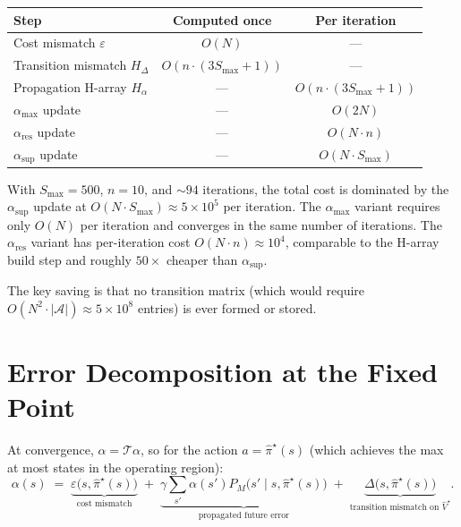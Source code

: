 \documentclass[11pt]{article}
\newcommand{\Smax}{S_{\max}}
\newcommand{\pihatstar}{\hat\pi^\star}
\newcommand{\Vhatstar}{\hat V^\star}
\newcommand{\alphares}{\alpha_{\mathrm{res}}}
\begin{document}
\begin{center}
\begin{tabular}{lcc}
\toprule
Step & Computed once & Per iteration \\
\midrule
Cost mismatch $\varepsilon$ & $O(N)$ & --- \\
Transition mismatch $H_\Delta$ & $O(n \cdot (3\Smax+1))$ & --- \\
Propagation H-array $H_\alpha$ & --- & $O(n \cdot (3\Smax+1))$ \\
$\alpha_{\max}$ update & --- & $O(2N)$ \\
$\alphares$ update & --- & $O(N \cdot n)$ \\
$\alpha_{\sup}$ update & --- & $O(N \cdot \Smax)$ \\
\bottomrule
\end{tabular}
\end{center}

With $\Smax = 500$, $n = 10$, and $\sim 94$ iterations, the total cost is
dominated by the $\alpha_{\sup}$ update at $O(N \cdot \Smax) \approx 5 \times
10^5$ per iteration.  The $\alpha_{\max}$ variant requires only $O(N)$ per
iteration and converges in the same number of iterations.  The $\alphares$
variant has per-iteration cost $O(N \cdot n) \approx 10^4$, comparable to the
H-array build step and roughly $50\times$ cheaper than $\alpha_{\sup}$.

The key saving is that no transition matrix (which would require
$O(N^2 \cdot |\mathcal{A}|) \approx 5 \times 10^8$ entries) is ever formed or
stored.

\section{Error Decomposition at the Fixed Point}

At convergence, $\alpha = \mathcal{T}\alpha$, so for the action
$a = \pihatstar(s)$ (which achieves the max at most states in the operating
region):
\begin{equation}\label{eq:decomposition}
  \alpha(s)
  \;=\; \underbrace{\varepsilon\bigl(s, \pihatstar(s)\bigr)}_{\text{cost mismatch}}
  \;+\; \underbrace{\gamma \sum_{s'} \alpha(s')  P_M\bigl(s' \mid s, \pihatstar(s)\bigr)}_{\text{propagated future error}}
  \;+\; \underbrace{\Delta\bigl(s, \pihatstar(s)\bigr)}_{\text{transition mismatch on }\Vhatstar}.
\end{equation}
\end{document}
